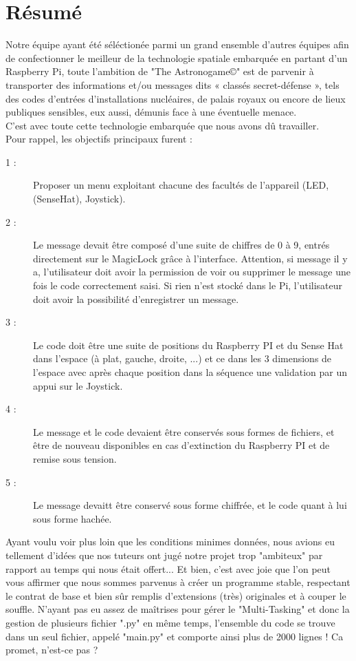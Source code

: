 \section{Résumé}
Notre équipe ayant été séléctionée parmi un grand ensemble d'autres équipes afin de confectionner le meilleur de la technologie spatiale embarquée en partant d'un Raspberry Pi, toute l’ambition de "The Astronogame©" est de parvenir à transporter des informations et/ou messages dits « classés secret-défense », tels des codes d’entrées d’installations nucléaires, de palais royaux ou encore de lieux publiques sensibles, eux aussi, démunis face à une éventuelle menace.\\
C'est avec toute cette technologie embarquée que nous avons dû travailler.\\

\newline
Pour rappel, les objectifs principaux furent :
\begin{description}
    \item [1 :] Proposer un menu exploitant chacune des facultés de l'appareil (LED, (SenseHat), Joystick).
    \item [2 :] Le message devait être composé d’une suite de chiffres de 0 à 9, entrés directement sur le MagicLock grâce à l’interface. Attention, si message il y a, l'utilisateur doit avoir la permission de voir ou supprimer le message une fois le code correctement saisi. Si rien n'est stocké dans le Pi, l'utilisateur doit avoir la possibilité d'enregistrer un message.
    \item [3 :] Le code doit être une suite de positions du Raspberry PI et du Sense Hat dans l’espace (à plat, gauche, droite, ...) et ce dans les 3 dimensions de l’espace avec après chaque position dans la séquence une validation par un appui sur le Joystick.
    \item [4 :] Le message et le code devaient être conservés sous formes de fichiers, et être de nouveau disponibles en cas d’extinction du Raspberry PI et de remise sous tension.
    \item [5 :] Le message devaitt être conservé sous forme chiffrée, et le code quant à lui sous forme hachée.
\newline
\newline
\end{description}

Ayant voulu voir plus loin que les conditions minimes données, nous avions eu tellement d'idées que nos tuteurs ont jugé notre projet trop "ambiteux" par rapport au temps qui nous était offert... Et bien, c'est avec joie que l'on peut vous affirmer que nous sommes parvenus à créer un programme stable, respectant le contrat de base et bien sûr remplis d'extensions (très) originales et à couper le souffle.
N'ayant pas eu assez de maîtrises pour gérer le "Multi-Tasking" et donc la gestion de plusieurs fichier ".py" en même temps, l'ensemble du code se trouve dans un seul fichier, appelé "main.py" et comporte ainsi plus de 2000 lignes ! Ca promet, n'est-ce pas ?
\newline

